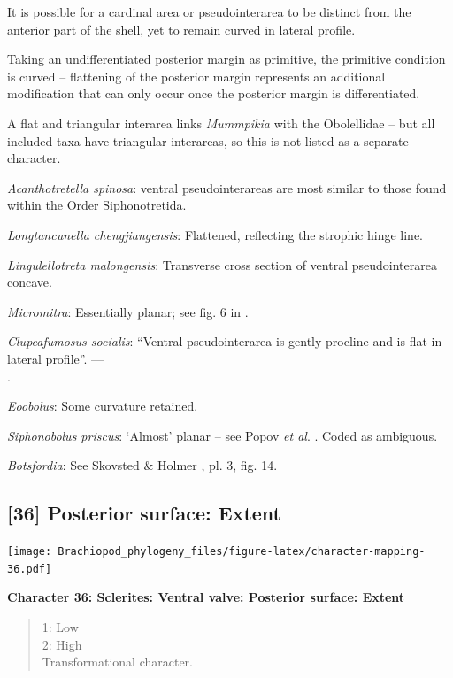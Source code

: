\documentclass[]{book}
\theoremstyle{definition}
\theoremstyle{definition}
\theoremstyle{definition}
\theoremstyle{remark}
\begin{document}
It is possible for a cardinal area or pseudointerarea to be distinct
from the anterior part of the shell, yet to remain curved in lateral
profile.

Taking an undifferentiated posterior margin as primitive, the primitive
condition is curved -- flattening of the posterior margin represents an
additional modification that can only occur once the posterior margin is
differentiated.

A flat and triangular interarea links \emph{Mummpikia} with the
Obolellidae \citep{Balthasar2008iMummpikia} -- but all included taxa
have triangular interareas, so this is not listed as a separate
character.

\emph{Acanthotretella spinosa}: ventral pseudointerareas are most
similar to those found within the Order Siphonotretida.

\emph{Longtancunella chengjiangensis}: Flattened, reflecting the
strophic hinge line.

\emph{Lingulellotreta malongensis}: Transverse cross section of ventral
pseudointerarea concave.

\emph{Micromitra}: Essentially planar; see fig. 6 in
\citet{Ushatinskaya2016Protegulumand}.

\emph{Clupeafumosus socialis}: ``Ventral pseudointerarea is gently
procline and is flat in lateral profile''. ---\\
\citep{Topper2013Reappraisalof}.

\emph{Eoobolus}: Some curvature retained.

\emph{Siphonobolus priscus}: `Almost' planar -- see Popov \emph{et al}.
\citeyearpar[fig. 4]{Popov2009Earlyontogeny}. Coded as ambiguous.

\emph{Botsfordia}: See Skovsted \& Holmer
\citeyearpar{Skovsted2005EarlyCambrian}, pl. 3, fig. 14.

\hypertarget{posterior-surface-extent}{%
\subsection*{{[}36{]} Posterior surface:
Extent}\label{posterior-surface-extent}}

\texttt{[image: Brachiopod\_phylogeny\_files/figure-latex/character-mapping-36.pdf]}

\textbf{Character 36: Sclerites: Ventral valve: Posterior surface:
Extent}

\begin{quote}
1: Low\\
2: High\\
Transformational character.
\end{quote}
\end{document}
